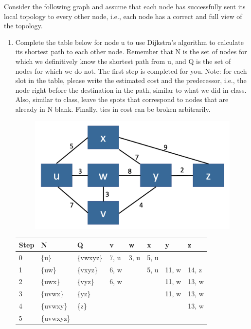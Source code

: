 \documentclass[10pt]{article}
\newenvironment{problem}[2][Problem]{\begin{trivlist}
\item[\hskip \labelsep {\bfseries #1}\hskip \labelsep {\bfseries #2.}]}{\end{trivlist}}
\begin{document}
\begin{problem}{2: Link State Routing}
Consider the following graph and assume that each node has successfully sent its local topology to every other node, i.e., each node has a correct and full view of the topology. 

\begin{enumerate}
    \item 
Complete the table below for node u to use Dijkstra's algorithm to calculate its shortest path to each other node. Remember that N is the set of nodes for which we definitively know the shortest path from u, and Q is the set of nodes for which we do not. The first step is completed for you. Note: for each slot in the table, please write the estimated cost and the predecessor, i.e., the node right before the destination in the path, similar to what we did in class. Also, similar to class, leave the spots that correspond to nodes that are already in N blank. Finally, ties in cost can be broken arbitrarily.

\begin{figure}[h]
    \centering
    \includegraphics[scale=0.3]{figures/linkstate.pdf}
    \label{fig:dvp}
\end{figure}

\begin{table}[ht]
\begin{center}
\begin{tabular}{|p{1.5cm}|p{1.5cm}|p{1.5cm}|p{1cm}|p{1cm}|p{1cm}|p{1cm}|p{1cm}|}
	\hline
	Step & N & Q & v & w & x & y & z\\
	\hline
	0 & \{u\} & \{vwxyz\} & 7, u& 3, u& 5, u& &\\
	\hline
    1 & \{uw\} & \{vxyz\} &6, w &  & 5, u & 11, w & 14, z\\
	\hline
    2 & \{uwx\} & \{vyz\} & 6, w & & & 11, w & 13, w\\
	\hline
	3 & \{uvwx\}& \{yz\} &  & & & 11, w& 13, w\\
	\hline
	4 & \{uvwxy\} & \{z\} & & & & & 13, w\\
	\hline
	5 & \{uvwxyz\}& & & & & &\\
	\hline
	

\end{tabular}
\end{center}
\end{table}
\end{enumerate}
\end{problem}
\end{document}
